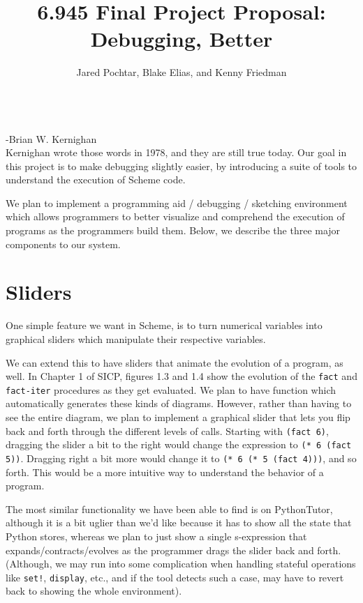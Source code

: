 \documentclass[11pt]{article}
\begin{document}
\title{6.945 Final Project Proposal: Debugging, Better}
\author{Jared Pochtar, Blake Elias, and Kenny Friedman}
\maketitle

 \\
-Brian W. Kernighan \\

Kernighan wrote those words in 1978, and they are still true today. Our goal in this project is to make debugging slightly easier, by introducing a suite of tools to understand the execution of Scheme code.

We plan to implement a programming aid / debugging / sketching environment which allows programmers to better visualize and comprehend the execution of programs as the programmers build them. Below, we describe the three major components to our system.

\section{Sliders}

One simple feature we want in Scheme, is to turn numerical variables into graphical sliders which manipulate their respective variables. 

We can extend this to have sliders that animate the evolution of a program, as well. In Chapter 1 of SICP, figures 1.3 and 1.4 show the evolution of the \verb|fact| and \verb|fact-iter| procedures as they get evaluated. We plan to have function which automatically generates these kinds of diagrams. However, rather than having to see the entire diagram, we plan to implement a graphical slider that lets you flip back and forth through the different levels of calls. Starting with \verb|(fact 6)|, dragging the slider a bit to the right would change the expression to \verb|(* 6 (fact 5))|. Dragging right a bit more would change it to \verb|(* 6 (* 5 (fact 4)))|, and so forth. This would be a more intuitive way to understand the behavior of a program.

The most similar functionality we have been able to find is on PythonTutor, although it is a bit uglier than we'd like because it has to show all the state that Python stores, whereas we plan to just show a single s-expression that expands/contracts/evolves as the programmer drags the slider back and forth. (Although, we may run into some complication when handling stateful operations like \verb|set!|, \verb|display|, etc., and if the tool detects such a case, may have to revert back to showing the whole environment).
\end{document}
